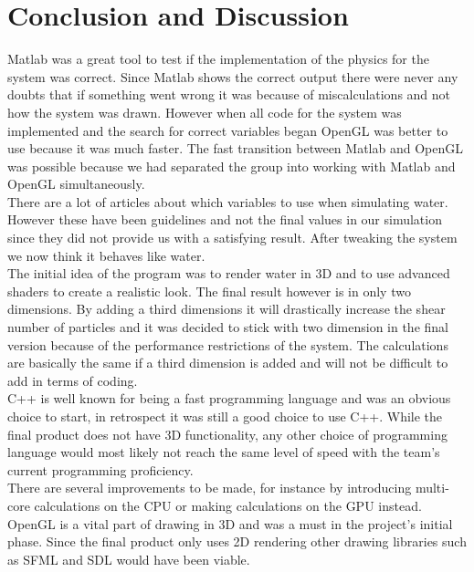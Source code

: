 \documentclass[a4paper,12pt,twoside,final]{report}
\begin{document}
\chapter{Conclusion and Discussion}

Matlab was a great tool to test if the implementation of the physics for the system was correct. Since Matlab shows the correct output there were never any doubts that if something went wrong it was because of miscalculations and not how the system was drawn. However when all code for the system was implemented and the search for correct variables began OpenGL was better to use because it was much faster. The fast transition between Matlab and OpenGL was possible because we had separated the group into working with Matlab and OpenGL simultaneously. \\

\noindent There are a lot of articles about which variables to use when simulating water. However these have been guidelines and not the final values in our simulation since they did not provide us with a satisfying result. After tweaking the system we now think it behaves like water. \\

\noindent The initial idea of the program was to render water in 3D and to use advanced shaders to create a realistic look. The final result however is in only two dimensions. By adding a third dimensions it will drastically increase the shear number of particles and it was decided to stick with two dimension in the final version because of the performance restrictions of the system. The calculations are basically the same if a third dimension is added and will not be difficult to add in terms of coding. \\

\noindent C++ is well known for being a fast programming language and was an obvious choice to start, in retrospect it was still a good choice to use C++. While the final product does not have 3D functionality, any other choice of programming language would most likely not reach the same level of speed with the team’s current programming proficiency. \\

\noindent There are several improvements to be made, for instance by introducing multi-core calculations on the CPU or making calculations on the GPU instead. OpenGL is a vital part of drawing in 3D and was a must in the project’s initial phase. Since the final product only uses 2D rendering other drawing libraries such as SFML and SDL would have been viable.
\end{document}
